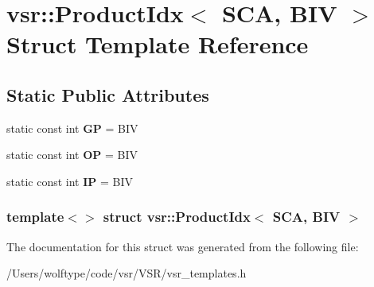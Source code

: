 \hypertarget{structvsr_1_1_product_idx_3_01_s_c_a_00_01_b_i_v_01_4}{\section{vsr\-:\-:Product\-Idx$<$ S\-C\-A, B\-I\-V $>$ Struct Template Reference}
\label{structvsr_1_1_product_idx_3_01_s_c_a_00_01_b_i_v_01_4}
}
\subsection*{Static Public Attributes}
\begin{DoxyCompactItemize}
\item 
\hypertarget{structvsr_1_1_product_idx_3_01_s_c_a_00_01_b_i_v_01_4_a8a40928644475ffcde0c6d85015b3d1c}{static const int {\bfseries G\-P} = B\-I\-V}\label{structvsr_1_1_product_idx_3_01_s_c_a_00_01_b_i_v_01_4_a8a40928644475ffcde0c6d85015b3d1c}

\item 
\hypertarget{structvsr_1_1_product_idx_3_01_s_c_a_00_01_b_i_v_01_4_a5e99bf9f2ba02aafa5a6fa4b2aeac252}{static const int {\bfseries O\-P} = B\-I\-V}\label{structvsr_1_1_product_idx_3_01_s_c_a_00_01_b_i_v_01_4_a5e99bf9f2ba02aafa5a6fa4b2aeac252}

\item 
\hypertarget{structvsr_1_1_product_idx_3_01_s_c_a_00_01_b_i_v_01_4_ab0c04475877ad4de3635c9613a3cab52}{static const int {\bfseries I\-P} = B\-I\-V}\label{structvsr_1_1_product_idx_3_01_s_c_a_00_01_b_i_v_01_4_ab0c04475877ad4de3635c9613a3cab52}

\end{DoxyCompactItemize}
\subsubsection*{template$<$$>$ struct vsr\-::\-Product\-Idx$<$ S\-C\-A, B\-I\-V $>$}



The documentation for this struct was generated from the following file\-:\begin{DoxyCompactItemize}
\item 
/\-Users/wolftype/code/vsr/\-V\-S\-R/vsr\-\_\-templates.\-h\end{DoxyCompactItemize}
